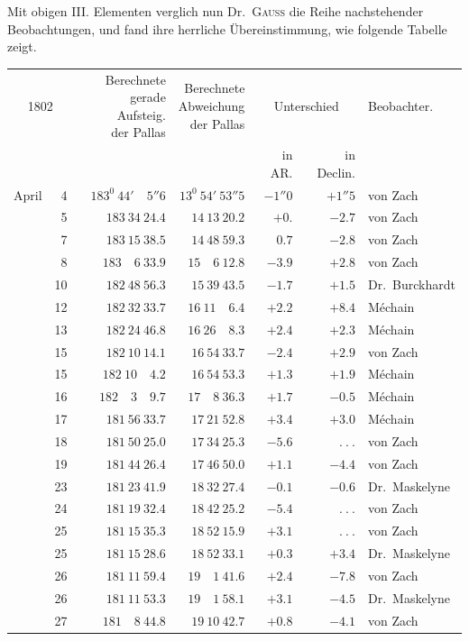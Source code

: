 Mit obigen III. Elementen verglich nun Dr.\ \textsc{Gauss} die Reihe nachstehender Beobachtungen, und fand ihre herrliche Übereinstimmung, wie folgende Tabelle zeigt.
\begin{center}
{\small\setlength{\tabcolsep}{4pt}
\begin{tabular}{r r|r|r|r|r|l}
\multicolumn{2}{c|}{1802}&\shortstack{Berechnete\\gerade Aufsteig.\\der Pallas}&\shortstack{Berechnete\\Abweichung\\der Pallas}&\multicolumn{2}{c|}{Unterschied}&Beobachter.\\
\multicolumn{2}{c|}{}&&&in AR.&in Declin.&\\\hline
April&4&$183^0\ 44'\quad5''6$&$13^0\ 54'\ 53''5$&$-1''0$&$+1''5$&von Zach\\
&5&$183\ 34\ 24.4$&$14\ 13\ 20.2$&$+0.$&$-2.7$&von Zach\\
&7&$183\ 15\ 38.5$&$14\ 48\ 59.3$&$0.7$&$-2.8$&von Zach\\
&8&$183\quad6\ 33.9$&$15\quad6\ 12.8$&$-3.9$&$+2.8$&von Zach\\
&10&$182\ 48\ 56.3$&$15\ 39\ 43.5$&$-1.7$&$+1.5$&Dr.\ Burckhardt\\
&12&$182\ 32\ 33.7$&$16\ 11\quad6.4$&$+2.2$&$+8.4$&Méchain\\
&13&$182\ 24\ 46.8$&$16\ 26\quad8.3$&$+2.4$&$+2.3$&Méchain\\
&15&$182\ 10\ 14.1$&$16\ 54\ 33.7$&$-2.4$&$+2.9$&von Zach\\
&15&$182\ 10\quad4.2$&$16\ 54\ 53.3$&$+1.3$&$+1.9$&Méchain\\
&16&$182\quad3\quad9.7$&$17\quad8\ 36.3$&$+1.7$&$-0.5$&Méchain\\
&17&$181\ 56\ 33.7$&$17\ 21\ 52.8$&$+3.4$&$+3.0$&Méchain\\
&18&$181\ 50\ 25.0$&$17\ 34\ 25.3$&$-5.6$&$\ .\ .\ .$&von Zach\\
&19&$181\ 44\ 26.4$&$17\ 46\ 50.0$&$+1.1$&$-4.4$&von Zach\\
&23&$181\ 23\ 41.9$&$18\ 32\ 27.4$&$-0.1$&$-0.6$&Dr.\ Maskelyne\\
&24&$181\ 19\ 32.4$&$18\ 42\ 25.2$&$-5.4$&$\ .\ .\ .$&von Zach\\
&25&$181\ 15\ 35.3$&$18\ 52\ 15.9$&$+3.1$&$\ .\ .\ .$&von Zach\\
&25&$181\ 15\ 28.6$&$18\ 52\ 33.1$&$+0.3$&$+3.4$&Dr.\ Maskelyne\\
&26&$181\ 11\ 59.4$&$19\quad1\ 41.6$&$+2.4$&$-7.8$&von Zach\\
&26&$181\ 11\ 53.3$&$19\quad1\ 58.1$&$+3.1$&$-4.5$&Dr.\ Maskelyne\\
&27&$181\quad8\ 44.8$&$19\ 10\ 42.7$&$+0.8$&$-4.1$&von Zach
\end{tabular}}
\end{center}

